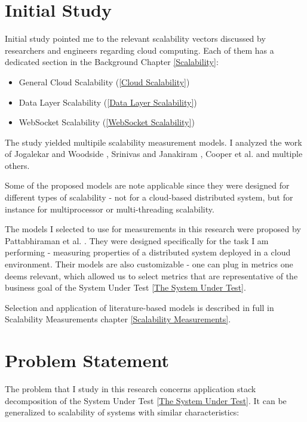 \documentclass{uvamscse}
\begin{document}
\section{Initial Study}

Initial study pointed me to the relevant scalability vectors discussed by researchers and engineers regarding cloud computing. Each of them has a dedicated section in the Background Chapter \ref{Scalability}:

\begin{itemize}
  \item General Cloud Scalability (\ref{Cloud Scalability})
  \item Data Layer Scalability (\ref{Data Layer Scalability})
  \item WebSocket Scalability (\ref{WebSocket Scalability})
\end{itemize}

The study yielded multipile scalability measurement models. I analyzed the work of Jogalekar and Woodside \cite{EvaScaDS}, Srinivas and Janakiram \cite{SriJan}, Cooper et al. \cite{Ycsb} and multiple others.

Some of the proposed models are note applicable since they were designed for different types of scalability - not for a cloud-based distributed system, but for instance for multiprocessor or multi-threading scalability.

The models I selected to use for measurements in this research were proposed by Pattabhiraman et al. \cite{Models}. They were designed specifically for the task I am performing - measuring properties of a distributed system deployed in a cloud environment. Their models are also customizable - one can plug in metrics one deems relevant, which allowed us to select metrics that are representative of the business goal of the System Under Test \ref{The System Under Test}.

Selection and application of literature-based models is described in full in Scalability Measurements chapter \ref{Scalability Measurements}.

\section{Problem Statement}\label{Problem Statement}

The problem that I study in this research concerns application stack decomposition of the System Under Test \ref{The System Under Test}. It can be generalized to scalability of systems with similar characteristics:
\end{document}
